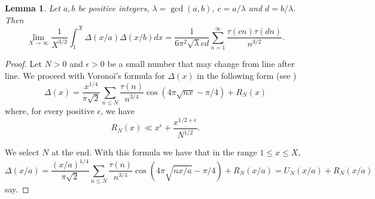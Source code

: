 \documentclass[a4paper,12pt, reqn0]{amsart}
\newtheorem{lemma}{Lemma}[section]
\theoremstyle{remark}
\begin{document}
\begin{lemma}
\label{firstlimit}
  Let $a,b$ be positive integers,
  $\lambda=\gcd(a,b)$, $c=a/\lambda$ and $d=b/\lambda$. Then
  \begin{equation*}
    \lim_{X\to\infty}\frac{1}{X^{3/2}}\int_1^X\Delta(x/a)\Delta(x/b)dx
    =
    \frac{1}{6\pi^2\sqrt{\lambda}cd}
    \sum_{n=1}^\infty\frac{\tau(cn)\tau(dn)}{n^{3/2}}.
  \end{equation*}
\end{lemma}
\begin{proof}
  Let $N>0$ and $\epsilon>0$ be a small number that may change from
  line after line. We proceed with Vorono\"i's formula for $\Delta(x)$
  in the following form (see \cite{Lau-Tsang*95})
\begin{equation*}
    \Delta(x)=\frac{x^{1/4}}{\pi\sqrt{2}}\sum_{n\leq N}\frac{\tau(n)}{n^{3/4}}\cos(4\pi\sqrt{nx}-\pi/4)+R_N(x)
\end{equation*}
where, for every positive $\epsilon$, we have
\begin{equation*}
R_N(x)\ll x^\epsilon+\frac{x^{1/2+\epsilon}}{N^{1/2}}.
\end{equation*}

We select $N$ at the end. With this formula we have that in the range $1\leq x\leq X$,
\begin{equation*}
  \Delta(x/a)
  =\frac{(x/a)^{1/4}}{\pi\sqrt{2}}
  \sum_{n\leq
    N}\frac{\tau(n)}{n^{3/4}}\cos(4\pi\sqrt{nx/a}-\pi/4)
  +R_N(x/a)=U_N(x/a)+R_N(x/a)
\end{equation*}
say.


\end{proof}
\end{document}
